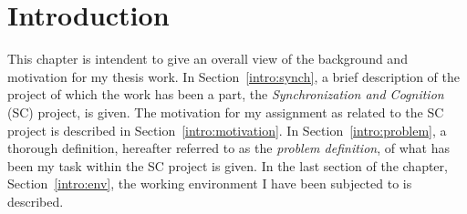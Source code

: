 
\cleardoublepage
\chapter{Introduction}
\label{intro}

This chapter is intendent to give an overall view of the background
and motivation for my thesis work.  In Section~\ref{intro:synch}, a
brief description of the project of which the work has been a part,
the {\em Synchronization and Cognition\/} (SC) project, is given.  The
motivation for my assignment as related to the SC project is described
in Section~\ref{intro:motivation}.  In Section~\ref{intro:problem}, a
thorough definition, hereafter referred to as the {\em problem
  definition\/}, of what has been my task within the SC project is
given.  In the last section of the chapter, Section~\ref{intro:env},
the working environment I have been subjected to is described.





